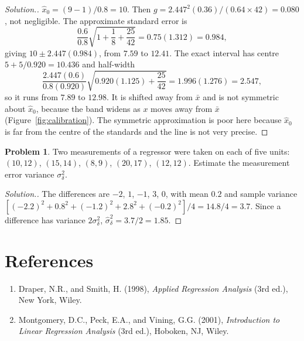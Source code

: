 \documentclass[11pt,a4paper]{article}
\numberwithin{equation}{section}
\theoremstyle{definition}
\newtheorem{problemx}{Problem}[subsection]
\newenvironment{problem}{\begin{problemx}}{\end{problemx}}
\newenvironment{solution}
  {\renewcommand{\qedsymbol}{}\begin{proof}[\textit{Solution}.]}
  {\end{proof}}
\begin{document}
\begin{solution}
$\hat x_0 = (9 - 1)/0.8 = 10$. Then $g = 2.447^2(0.36)/(0.64 \times 42) = 0.080$, not negligible. The approximate standard error is
\[
\frac{0.6}{0.8}\sqrt{1 + \frac18 + \frac{25}{42}} = 0.75(1.312) = 0.984 ,
\]
giving $10 \pm 2.447(0.984)$, from $7.59$ to $12.41$. The exact interval has centre $5 + 5/0.920 = 10.436$ and half-width
\[
\frac{2.447(0.6)}{0.8(0.920)}\sqrt{0.920(1.125) + \frac{25}{42}} = 1.996(1.276) = 2.547 ,
\]
so it runs from $7.89$ to $12.98$. It is shifted away from $\bar x$ and is not symmetric about $\hat x_0$, because the band
widens as $x$ moves away from $\bar x$ (Figure~\ref{fig:calibration}). The symmetric approximation is poor here because $\hat x_0$ is far
from the centre of the standards and the line is not very precise.
\end{solution}

\begin{problem}\label{prob:replicates}
Two measurements of a regressor were taken on each of five units: $(10, 12)$, $(15, 14)$, $(8, 9)$, $(20, 17)$, $(12, 12)$.
Estimate the measurement error variance $\sigma_\delta^2$.
\end{problem}

\begin{solution}
The differences are $-2$, $1$, $-1$, $3$, $0$, with mean $0.2$ and sample variance
$[(-2.2)^2 + 0.8^2 + (-1.2)^2 + 2.8^2 + (-0.2)^2]/4 = 14.8/4 = 3.7$. Since a difference has variance $2\sigma_\delta^2$,
$\hat\sigma_\delta^2 = 3.7/2 = 1.85$.
\end{solution}

\section*{References}

\begin{enumerate}
\item Draper, N.R., and Smith, H. (1998), \emph{Applied Regression Analysis} (3rd ed.), New York, Wiley.
\item Montgomery, D.C., Peck, E.A., and Vining, G.G. (2001), \emph{Introduction to Linear Regression Analysis} (3rd ed.), Hoboken, NJ, Wiley.
\end{enumerate}
\end{document}
